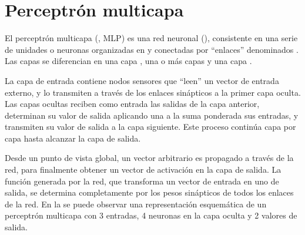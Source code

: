 %
%
%
\section{Perceptrón multicapa}
%
El perceptrón multicapa (, MLP)
\cite{mlp2,mlp1} es una red neuronal \feedforward{}
(), consistente en una serie de {unidades} o
neuronas organizadas en  y conectadas por ``enlaces''
denominados .  Las capas se diferencian en
una capa , una o más capas  y una capa
.

La capa de entrada contiene nodos sensores que ``leen'' un vector
de entrada externo, y lo transmiten a través de los enlaces sinápticos
a la primer capa oculta. Las capas ocultas reciben como entrada las
salidas de la capa anterior, determinan su valor de salida aplicando
una  a la suma ponderada sus entradas, y
transmiten su valor de salida a la capa siguiente. Este proceso
continúa capa por capa hasta alcanzar la capa de salida.

Desde un punto de vista global, un vector arbitrario es propagado
 a través de la red, para finalmente obtener un
vector de activación en la capa de salida.  La función generada por la
red, que transforma un vector de entrada en uno de salida, se
determina completamente por los pesos sinápticos de todos los enlaces
de la red.  En la  se puede observar una representación
esquemática de un perceptrón multicapa con 3 entradas, 4 neuronas en
la capa oculta y 2 valores de salida.
